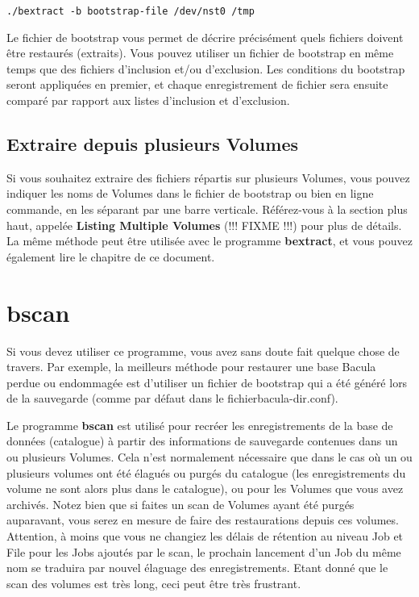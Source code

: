 \footnotesize
\begin{verbatim}
./bextract -b bootstrap-file /dev/nst0 /tmp
\end{verbatim}
\normalsize

Le fichier de bootstrap vous permet de décrire précisément quels fichiers 
doivent être restaurés (extraits). Vous pouvez utiliser un fichier de bootstrap
en même temps que des fichiers d'inclusion et/ou d'exclusion. Les conditions
du bootstrap seront appliquées en premier, et chaque enregistrement de fichier
sera ensuite comparé par rapport aux listes d'inclusion et d'exclusion.

\subsection{Extraire depuis plusieurs Volumes}

Si vous souhaitez extraire des fichiers répartis sur plusieurs Volumes, vous
pouvez indiquer les noms de Volumes dans le fichier de bootstrap ou bien en  
ligne commande, en les séparant par une barre verticale. Référez-vous à la 
section plus haut, appelée {\bf Listing Multiple Volumes} (!!! FIXME !!!) pour
plus de détails. La même méthode peut être utilisée avec le programme 
{\bf bextract}, et vous pouvez également lire le chapitre 
 de ce document.

\section{bscan}
\label{bscan}


Si vous devez utiliser ce programme, vous avez sans doute fait quelque chose
de travers. Par exemple, la meilleurs méthode pour restaurer une base Bacula
perdue ou endommagée est d'utiliser un fichier de bootstrap qui a été généré
lors de la sauvegarde (comme par défaut dans le fichierbacula-dir.conf).

Le programme {\bf bscan} est utilisé pour recréer les enregistrements de la 
base de données (catalogue) à partir des informations de sauvegarde contenues
dans un ou plusieurs Volumes. Cela n'est normalement nécessaire que dans le cas
où un ou plusieurs volumes ont été élagués ou purgés du catalogue (les 
enregistrements du volume ne sont alors plus dans le catalogue), ou pour
les Volumes que vous avez archivés. Notez bien que si faites un scan de Volumes
ayant été purgés auparavant, vous serez en mesure de faire des restaurations
depuis ces volumes.  Attention, à moins que vous ne changiez les délais de
rétention au niveau Job et File pour les Jobs ajoutés par le scan, le prochain
lancement d'un Job du même nom se traduira par nouvel élaguage des
enregistrements.  Etant donné que le scan des volumes est très long, ceci peut
être très frustrant.

